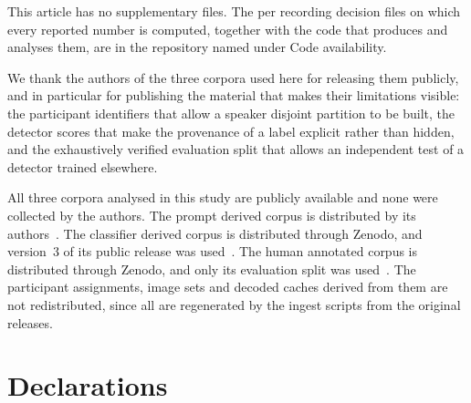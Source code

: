 \backmatter


This article has no supplementary files. The per recording decision files on which every
reported number is computed, together with the code that produces and analyses them, are
in the repository named under Code availability.


We thank the authors of the three corpora used here for releasing them publicly, and in
particular for publishing the material that makes their limitations visible: the
participant identifiers that allow a speaker disjoint partition to be built, the detector
scores that make the provenance of a label explicit rather than hidden, and the
exhaustively verified evaluation split that allows an independent test of a detector
trained elsewhere.


All three corpora analysed in this study are publicly available and none were collected
by the authors. The prompt derived corpus is distributed by its authors~\cite{coswara2020}.
The classifier derived corpus is distributed through Zenodo, and version~3 of its public
release was used~\cite{coughvid2021}. The human annotated corpus is distributed through
Zenodo, and only its evaluation split was used~\cite{fsd50k2022}. The participant
assignments, image sets and decoded caches derived from them are not redistributed, since
all are regenerated by the ingest scripts from the original releases.

\section*{Declarations}

